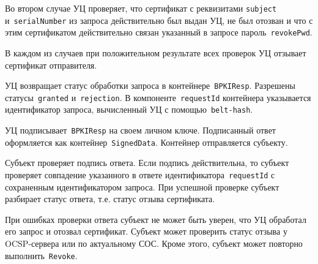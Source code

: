 Во втором случае УЦ проверяет, что сертификат с реквизитами 
\texttt{subject} и~\texttt{serialNumber} из запроса действительно
был выдан УЦ, не был отозван и что с этим сертификатом действительно 
связан указанный в запросе пароль~\texttt{revokePwd}.

В каждом из случаев при положительном результате всех проверок
УЦ отзывает сертификат отправителя. 

УЦ возвращает статус обработки запроса в контейнере~\texttt{BPKIResp}.
Разрешены статусы~\texttt{granted} и~\texttt{rejection}.
В компоненте~\texttt{requestId} контейнера указывается идентификатор 
запроса, вычисленный УЦ с помощью~\texttt{belt-hash}.

УЦ подписывает~\texttt{BPKIResp} на своем личном ключе. Подписанный ответ 
оформляется как контейнер~\texttt{SignedData}. Контейнер отправляется 
субъекту.

Субъект проверяет подпись ответа. Если подпись действительна,
то субъект проверяет совпадение указанного в ответе 
идентификатора~\texttt{requestId} с сохраненным идентификатором запроса. 
При успешной проверке субъект разбирает статус ответа, т.е. статус отзыва 
сертификата. 

При ошибках проверки ответа субъект не может быть уверен, что УЦ обработал
его запрос и отозвал сертификат. Субъект может проверить статус отзыва
у OCSP-сервера или по актуальному СОС. Кроме этого, субъект может 
повторно выполнить~\texttt{Revoke}. 

